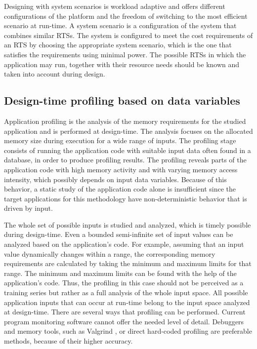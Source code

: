 Designing with system scenarios is workload adaptive and offers different configurations of the platform and the freedom of switching to the most efficient scenario at run-time. 
A system scenario is a configuration of the system that combines similar RTSs.
The system is configured to meet the cost requirements of an RTS by choosing the appropriate system scenario, which is the one that satisfies the requirements using minimal power.
The possible RTSs  in which the application may run, together with their resource needs should be known and taken into account during design.  



\subsection{Design-time profiling based on data variables}

Application profiling is the analysis of the memory requirements for the studied application and is performed at design-time.
The analysis focuses on the allocated memory size during execution  for a wide range of inputs. 
The profiling stage consists of running the application code with suitable input data often found in a database, in order to produce profiling results.  
The profiling reveals parts of the application code with high memory activity and with varying memory access intensity, which possibly depends on input data variables. 
Because of this behavior, a static study of the application code alone is insufficient since the target applications for this methodology have non-deterministic behavior that is driven by input.

The whole set of possible inputs is studied and analyzed, which is timely possible during design-time.
Even a bounded semi-infinite set of input values can be analyzed based on the application's code.
For example, assuming that an input value dynamically changes within a range, the corresponding memory requirements are calculated by taking the minimum and maximum limits for that range.
The minimum and maximum limits can be found with the help of the application's code.
Thus, the profiling in this case should not be perceived as a training series but rather as a full analysis of the whole input space.
All possible application inputs that can occur at run-time belong to the input space analyzed at design-time.
There are several ways that profiling can be performed. Current program monitoring software cannot offer the needed level of detail. Debuggers and memory tools, such as Valgrind \cite{Valgrind}, or direct hard-coded profiling are preferable methods, because of their higher accuracy.

